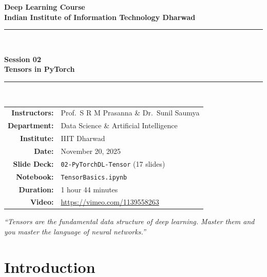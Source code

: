 \documentclass[12pt,a4paper]{article}
\newcommand{\tbf}[1]{\textbf{#1}}
\begin{document}
\begin{titlepage}
  \centering
  \vspace*{2cm}
  {\LARGE\bfseries Deep Learning Course\\[0.4em]
   \large Indian Institute of Information Technology Dharwad\par}
  \vspace{1.5cm}
  \rule{\linewidth}{0.5pt}\\[0.6em]
  {\Huge\bfseries Session 02\\[0.3em]
   \LARGE Tensors in PyTorch\par}
  \rule{\linewidth}{0.5pt}\\[1.2cm]

  \begin{tabular}{rl}
    \tbf{Instructors:}  & Prof.\ S R M Prasanna \& Dr.\ Sunil Saumya \\[4pt]
    \tbf{Department:}   & Data Science \& Artificial Intelligence \\[4pt]
    \tbf{Institute:}    & IIIT Dharwad \\[4pt]
    \tbf{Date:}         & November 20, 2025 \\[4pt]
    \tbf{Slide Deck:}   & \texttt{02-PyTorchDL-Tensor} (17 slides) \\[4pt]
    \tbf{Notebook:}     & \texttt{TensorBasics.ipynb} \\[4pt]
    \tbf{Duration:}     & 1 hour 44 minutes \\[4pt]
    \tbf{Video:}        & \url{https://vimeo.com/1139558263} \\
  \end{tabular}

  \vfill
  {\large\itshape ``Tensors are the fundamental data structure of deep learning.
   Master them and you master the language of neural networks.''\par}
  \vspace{1cm}
\end{titlepage}


\newpage

\section{Introduction}
\label{sec:intro}
\end{document}
